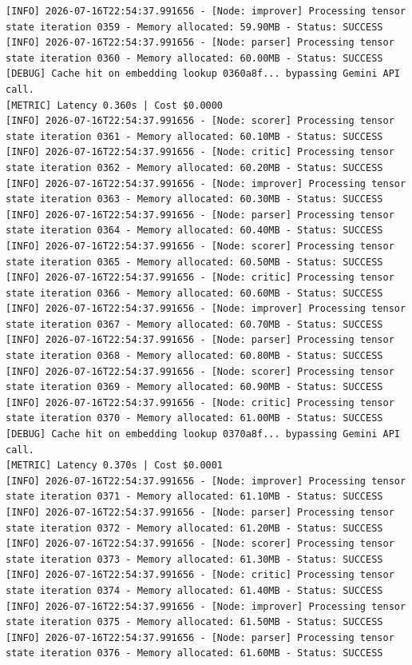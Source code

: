 \documentclass[10pt,journal,compsoc]{IEEEtran}
\begin{document}
\begin{verbatim}
[INFO] 2026-07-16T22:54:37.991656 - [Node: improver] Processing tensor state iteration 0359 - Memory allocated: 59.90MB - Status: SUCCESS
[INFO] 2026-07-16T22:54:37.991656 - [Node: parser] Processing tensor state iteration 0360 - Memory allocated: 60.00MB - Status: SUCCESS
[DEBUG] Cache hit on embedding lookup 0360a8f... bypassing Gemini API call.
[METRIC] Latency 0.360s | Cost $0.0000
[INFO] 2026-07-16T22:54:37.991656 - [Node: scorer] Processing tensor state iteration 0361 - Memory allocated: 60.10MB - Status: SUCCESS
[INFO] 2026-07-16T22:54:37.991656 - [Node: critic] Processing tensor state iteration 0362 - Memory allocated: 60.20MB - Status: SUCCESS
[INFO] 2026-07-16T22:54:37.991656 - [Node: improver] Processing tensor state iteration 0363 - Memory allocated: 60.30MB - Status: SUCCESS
[INFO] 2026-07-16T22:54:37.991656 - [Node: parser] Processing tensor state iteration 0364 - Memory allocated: 60.40MB - Status: SUCCESS
[INFO] 2026-07-16T22:54:37.991656 - [Node: scorer] Processing tensor state iteration 0365 - Memory allocated: 60.50MB - Status: SUCCESS
[INFO] 2026-07-16T22:54:37.991656 - [Node: critic] Processing tensor state iteration 0366 - Memory allocated: 60.60MB - Status: SUCCESS
[INFO] 2026-07-16T22:54:37.991656 - [Node: improver] Processing tensor state iteration 0367 - Memory allocated: 60.70MB - Status: SUCCESS
[INFO] 2026-07-16T22:54:37.991656 - [Node: parser] Processing tensor state iteration 0368 - Memory allocated: 60.80MB - Status: SUCCESS
[INFO] 2026-07-16T22:54:37.991656 - [Node: scorer] Processing tensor state iteration 0369 - Memory allocated: 60.90MB - Status: SUCCESS
[INFO] 2026-07-16T22:54:37.991656 - [Node: critic] Processing tensor state iteration 0370 - Memory allocated: 61.00MB - Status: SUCCESS
[DEBUG] Cache hit on embedding lookup 0370a8f... bypassing Gemini API call.
[METRIC] Latency 0.370s | Cost $0.0001
[INFO] 2026-07-16T22:54:37.991656 - [Node: improver] Processing tensor state iteration 0371 - Memory allocated: 61.10MB - Status: SUCCESS
[INFO] 2026-07-16T22:54:37.991656 - [Node: parser] Processing tensor state iteration 0372 - Memory allocated: 61.20MB - Status: SUCCESS
[INFO] 2026-07-16T22:54:37.991656 - [Node: scorer] Processing tensor state iteration 0373 - Memory allocated: 61.30MB - Status: SUCCESS
[INFO] 2026-07-16T22:54:37.991656 - [Node: critic] Processing tensor state iteration 0374 - Memory allocated: 61.40MB - Status: SUCCESS
[INFO] 2026-07-16T22:54:37.991656 - [Node: improver] Processing tensor state iteration 0375 - Memory allocated: 61.50MB - Status: SUCCESS
[INFO] 2026-07-16T22:54:37.991656 - [Node: parser] Processing tensor state iteration 0376 - Memory allocated: 61.60MB - Status: SUCCESS

\end{verbatim}
\end{document}
